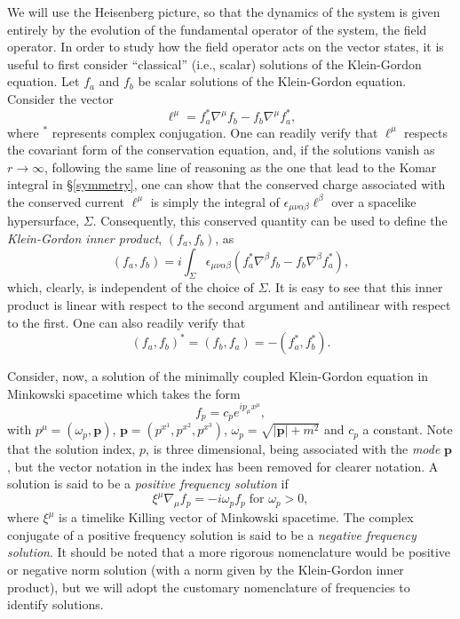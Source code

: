\documentclass[
12pt,		%
openright,	%
twoside,  %
a4paper,			%
chapter=TITLE,		%
english,			%
french,				%
spanish,			%
brazil				%
]{USPSC-classe/USPSC}
\begin{document}
We will use the Heisenberg picture, so that the dynamics of the system is given entirely by the evolution of the fundamental operator of the system, the field operator. In order to study how the field operator acts on the vector states, it is useful to first consider ``classical'' (i.e., scalar) solutions of the Klein-Gordon equation. Let $f_a$ and $f_b$ be scalar solutions of the Klein-Gordon equation. Consider the vector 
\begin{equation}
    \ell^{\mu}=f_a^*\nabla^{\mu}f_b-f_b\nabla^{\mu}f_a^*,
\end{equation}
where $^*$ represents complex conjugation. One can readily verify that $\ell^{\mu}$ respects the covariant form of the conservation equation, and, if the solutions vanish as $r\to\infty$, following the same line of reasoning as the one that lead to the Komar integral in \S\;\ref{symmetry}, one can show that the conserved charge associated with the conserved current $\ell^{\mu}$ is simply the integral of $\epsilon_{\mu\nu\alpha\beta}\ell^{\beta}$ over a spacelike hypersurface, $\Sigma$. Consequently, this conserved quantity can be used to define the \textit{Klein-Gordon inner product}, $(f_a,f_b)$, as
\begin{equation}\label{inner}
    (f_a,f_b)=i\int_{\Sigma} \epsilon_{\mu\nu\alpha\beta}\left(f_a^*\nabla^{\beta}f_b-f_b\nabla^{\beta}f_a^*\right),
\end{equation}
which, clearly, is independent of the choice of $\Sigma$. It is easy to see that this inner product is linear with respect to the second argument and antilinear with respect to the first. One can also readily verify that
\begin{equation}\label{inner1}
(f_a,f_b)^*=(f_b,f_a)=-(f_a^*,f_b^*).
\end{equation}

Consider, now, a solution of the minimally coupled Klein-Gordon equation in Minkowski spacetime which takes the form
\begin{equation}\label{KG1234}
    f_p=c_p e^{ip_{\mu}x^{\mu}},
\end{equation}
with $p^{\mu}=(\omega_p,\textbf{p})$, $\textbf{p}=(p^{x^1},p^{x^2},p^{x^3})$, $\omega_p=\sqrt{|\textbf{p}|+m^2}$ and $c_p$ a constant. Note that the solution index, $p$, is three dimensional, being associated with the \textit{mode} $\textbf{p}$, but the vector notation in the index has been removed for clearer notation. A solution is said to be a \textit{positive frequency solution} if
\begin{equation}\label{timeKG}
    \xi^{\mu}\nabla_{\mu}f_p=-i\omega_p f_p\;\text{for }\omega_p>0,
\end{equation}
where $\xi^{\mu}$ is a timelike Killing vector of Minkowski spacetime. The complex conjugate of a positive frequency solution is said to be a \textit{negative frequency solution}. It should be noted that a more rigorous nomenclature would be positive or negative norm solution (with a norm given by the Klein-Gordon inner product), but we will adopt the customary nomenclature of frequencies to identify solutions.
\end{document}
